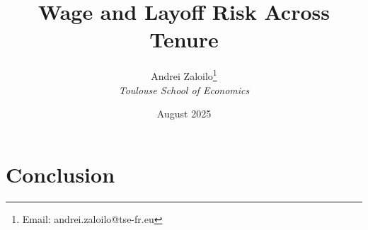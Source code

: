 \documentclass[12pt]{article}
\title{Wage and Layoff Risk Across Tenure}
\author{Andrei Zaloilo\footnote{Email: andrei.zaloilo@tse-fr.eu} \\ \textit{Toulouse School of Economics} }
\date{August 2025}
\begin{document}
\maketitle







%





\section{Conclusion}
\end{document}
